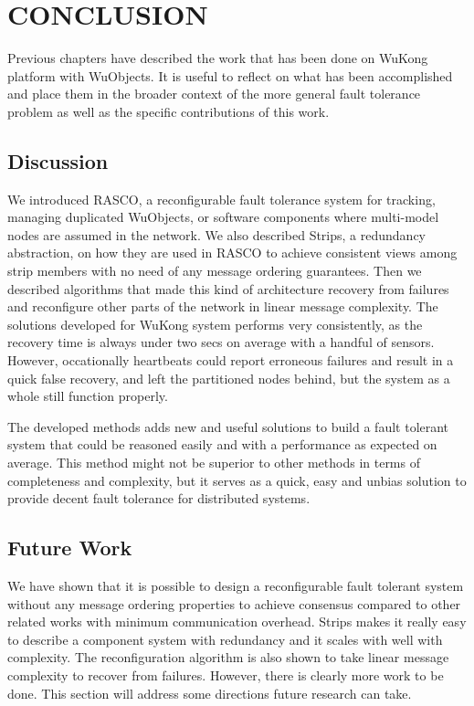 \cleardoublepage
\singlespacing
\chapter{CONCLUSION}
\label{c:conclusion}
\doublespacing\nointerlineskip

Previous chapters have described the work that has been done on WuKong platform with WuObjects. It is useful to reflect on what has been accomplished and place them in the broader context of the more general fault tolerance problem as well as the specific contributions of this work.

\section{Discussion}

We introduced RASCO, a reconfigurable fault tolerance system for tracking, 
managing duplicated WuObjects, or software components where multi-model nodes 
are assumed in the network. We also described Strips, a redundancy 
abstraction, on how they are used in RASCO to achieve consistent views 
among strip members with no need of any message ordering guarantees. Then 
we described algorithms that made this kind of architecture recovery from 
failures and reconfigure other parts of the network in linear message 
complexity. The solutions developed for WuKong system performs very consistently, as the recovery time is always under two secs on average with a handful of sensors. However, occationally heartbeats could report erroneous failures and result in a quick false recovery, and left the partitioned nodes behind, but the system as a whole still function properly.

The developed methods adds new and useful solutions to build a fault tolerant system that could be reasoned easily and with a performance as expected on average. This method might not be superior to other methods in terms of completeness and complexity, but it serves as a quick, easy and unbias solution to provide decent fault tolerance for distributed systems.

\section{Future Work}

We have shown that it is possible to design a reconfigurable fault tolerant system without any message ordering properties to achieve consensus compared to other related works with minimum communication overhead. Strips makes it really easy to describe a component system with redundancy and it scales with well with complexity. The reconfiguration algorithm is also shown to take linear message complexity to recover from failures. However, there is clearly more work to be done. This section will address some directions future research can take.

